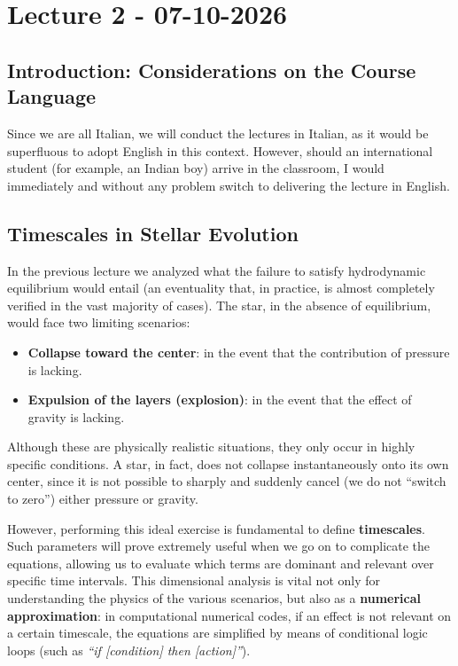 \chapter{Lecture 2 - 07-10-2026}

\section{Introduction: Considerations on the Course Language}
Since we are all Italian, we will conduct the lectures in Italian, as it would be superfluous to adopt English in this context. However, should an international student (for example, an Indian boy) arrive in the classroom, I would immediately and without any problem switch to delivering the lecture in English.

\section{Timescales in Stellar Evolution}
In the previous lecture we analyzed what the failure to satisfy hydrodynamic equilibrium would entail (an eventuality that, in practice, is almost completely verified in the vast majority of cases). The star, in the absence of equilibrium, would face two limiting scenarios:
\begin{itemize}
\item \textbf{Collapse toward the center}: in the event that the contribution of pressure is lacking.
\item \textbf{Expulsion of the layers (explosion)}: in the event that the effect of gravity is lacking.
\end{itemize}
Although these are physically realistic situations, they only occur in highly specific conditions. A star, in fact, does not collapse instantaneously onto its own center, since it is not possible to sharply and suddenly cancel (we do not ``switch to zero'') either pressure or gravity.

However, performing this ideal exercise is fundamental to define \textbf{timescales}. Such parameters will prove extremely useful when we go on to complicate the equations, allowing us to evaluate which terms are dominant and relevant over specific time intervals. This dimensional analysis is vital not only for understanding the physics of the various scenarios, but also as a \textbf{numerical approximation}: in computational numerical codes, if an effect is not relevant on a certain timescale, the equations are simplified by means of conditional logic loops (such as \textit{``if [condition] then [action]''}).

